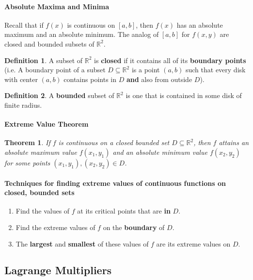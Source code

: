 \documentclass[12 pt]{article}
\newtheorem{thm}{Theorem}
\theoremstyle{definition}
\newtheorem{defn}{Definition}
\begin{document}
\paragraph{Absolute Maxima and Minima} Recall that if $f(x)$ is continuous on $[a,b]$, then $f(x)$ has an absolute maximum and an absolute minimum. The analog of $[a,b]$ for $f(x,y)$ are closed and bounded subsets of $\mathbb{R}^2$.
\begin{defn}
  A subset of $\mathbb{R}^2$ is \textbf{closed} if it contains all of its \textbf{boundary points} (i.e. A boundary point of a subset $D\subseteq \mathbb{R}^2$ is a point $(a,b)$ such that every disk with center $(a,b)$ contains points in $D$ \textbf{and} also from outside $D$).
\end{defn}
\begin{defn}
  A \textbf{bounded} subset of $\mathbb{R}^2$ is one that is contained in some disk of finite radius.
\end{defn}
\paragraph{Extreme Value Theorem}
\begin{thm}
  If $f$ is continuous on a closed bounded set $D\subseteq \mathbb{R}^2$, then $f$ attains an absolute maximum value $f(x_1,y_1)$ and an absolute minimum value $f(x_2,y_2)$ for some points $(x_1,y_1),(x_2,y_2)\in D$.
\end{thm}
\paragraph{Techniques for finding extreme values of continuous functions on closed, bounded sets}
\begin{enumerate}
\item Find the values of $f$ at its critical points that are \textbf{in} $D$.
\item Find the extreme values of $f$ on the \textbf{boundary} of $D$.
  \item The \textbf{largest} and \textbf{smallest} of these values of $f$ are its extreme values on $D$.
\end{enumerate}
\subsection{Lagrange Multipliers}
\end{document}

